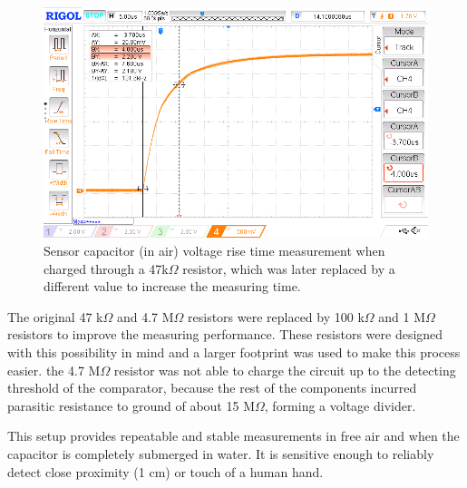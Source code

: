 \begin{figure}[H]
    \includegraphics[width=.8\textwidth]{fig/cap-measure-inv.png}
    \caption{\label{fig:cap-measure}Sensor capacitor (in air) voltage rise time measurement when charged through a 47k$\Omega$ resistor, which was later replaced by a different value to increase the measuring time.}
\end{figure}

The original 47 k$\Omega$ and 4.7 M$\Omega$ resistors were replaced by 100 k$\Omega$ and 1 M$\Omega$ resistors to improve the measuring performance. These resistors were designed with this possibility in mind and a larger footprint was used to make this process easier. the 4.7 M$\Omega$ resistor was not able to charge the circuit up to the detecting threshold of the comparator, because the rest of the components incurred parasitic resistance to ground of about 15 M$\Omega$, forming a voltage divider.

This setup provides repeatable and stable measurements in free air and when the capacitor is completely submerged in water. It is sensitive enough to reliably detect close proximity (1 cm) or touch of a human hand.


